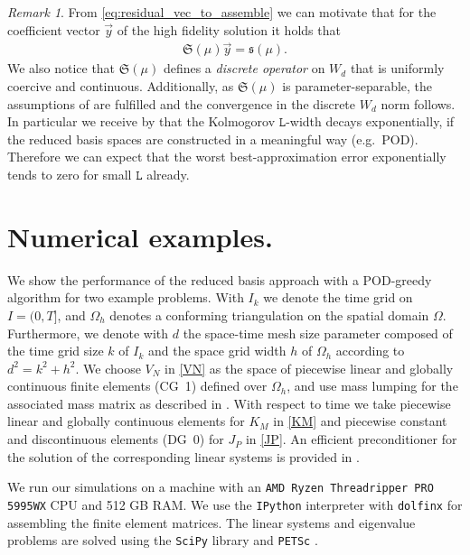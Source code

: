 \documentclass{article}
\theoremstyle{plain}
\theoremstyle{definition}
\theoremstyle{remark}
\newtheorem{remark}[theorem]{Remark}
\begin{document}
\begin{remark}
From \eqref{eq:residual_vec_to_assemble} we can motivate that for the coefficient vector $\Vec{y}$ of the high fidelity solution it holds that
\begin{align}
    \mathfrak{S}(\mu)\Vec{y} = \mathfrak{s}(\mu) .
\end{align}
We also notice that $\mathfrak{S}(\mu)$ defines a \textit{discrete operator} on $W_d$ that is uniformly coercive and continuous. Additionally, as $\mathfrak{S}(\mu)$ is parameter-separable, the assumptions of \cite[Thm.~3.1]{ohlberger} are fulfilled and the convergence in the discrete $W_d$ norm follows. In particular we receive by \cite[Thm.~3.1]{ohlberger} that the Kolmogorov $\texttt{L}$-width decays exponentially, if the reduced basis spaces are constructed in a meaningful way (e.g.~POD). Therefore we can expect that the worst best-approximation error exponentially tends to zero for small $\texttt{L}$ already.
\end{remark}

\section{Numerical examples.}\label{subsec:numericsRB}
We show the performance of the reduced basis approach with a POD-greedy algorithm \cites{SIENA2023127}{haasdonkCONVrb} for two example problems. With $I_k$ we denote the time grid on $I = (0,T]$, and $\Omega_h$ denotes a conforming triangulation on the spatial domain $\Omega$. Furthermore, we denote with $d$ the space-time mesh size parameter composed of the time grid size $k$ of $I_k$ and the space grid width $h$ of $\Omega_h$ according to $d^2 = k^2 + h^2$. We choose $V_N$ in \eqref{VN} as the space of piecewise linear and globally continuous finite elements (CG~1) defined over $\Omega_h$, and use mass lumping for the associated mass matrix as described in \cite[§~5.1.2, (1.20)]{GrossmannRoos}. With respect to time we take piecewise linear and globally continuous elements for $K_M$ in \eqref{KM} and piecewise constant and discontinuous elements (DG~0) for $J_P$ in \eqref{JP}. An efficient preconditioner for the solution of the corresponding linear systems is provided in \cite{preprint_SP}.

We run our simulations on a machine with an \texttt{AMD Ryzen Threadripper PRO 5995WX} CPU and 512 GB RAM. We use the \texttt{IPython} interpreter \cite{PER-GRA:2007} with \texttt{dolfinx} \cites{BarattaEtal2023}{BasixJoss}{ScroggsEtal2022}{AlnaesEtal2014} for assembling the finite element matrices. The linear systems and eigenvalue problems are solved using the \texttt{SciPy} library \cite{2020SciPy-NMeth} and \texttt{PETSc} \cites{petsc1}{petsc2}.
\end{document}
